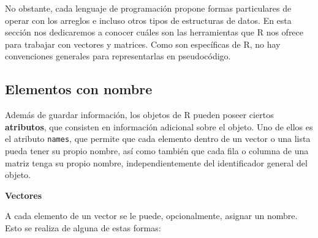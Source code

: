 \documentclass[
]{book}
\begin{document}
No obstante, cada lenguaje de programación propone formas particulares de operar con los arreglos e incluso otros tipos de estructuras de datos. En esta sección nos dedicaremos a conocer cuáles son las herramientas que R nos ofrece para trabajar con vectores y matrices. Como son específicas de R, no hay convenciones generales para representarlas en pseudocódigo.

\hypertarget{elementos-con-nombre}{%
\subsection{Elementos con nombre}\label{elementos-con-nombre}}

Además de guardar información, los objetos de R pueden poseer ciertos \textbf{atributos}, que consisten en información adicional sobre el objeto. Uno de ellos es el atributo \texttt{names}, que permite que cada elemento dentro de un vector o una lista pueda tener su propio nombre, así como también que cada fila o columna de una matriz tenga su propio nombre, independientemente del identificador general del objeto.

\textbf{Vectores}

A cada elemento de un vector se le puede, opcionalmente, asignar un nombre. Esto se realiza de alguna de estas formas:
\end{document}
